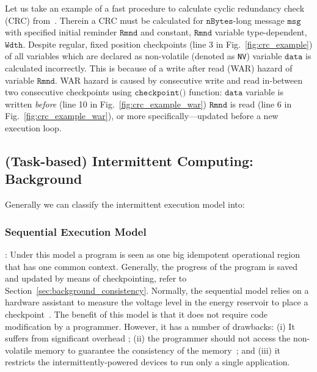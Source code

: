 Let us take an example of a fast procedure to calculate cyclic redundancy check (CRC) from~\cite{hicks_mibench2_2016}. Therein a CRC must be calculated for $\texttt{nBytes}$-long message $\texttt{msg}$ with specified initial reminder $\texttt{Rmnd}$ and constant, $\texttt{Rmnd}$ variable type-dependent, $\texttt{Wdth}$. Despite regular, fixed position checkpoints (line 3 in Fig.~\ref{fig:crc_example}) of all variables which are declared as non-volatile (denoted as \texttt{NV}) variable $\texttt{data}$ is calculated incorrectly. This is because of a write after read (WAR) hazard of variable $\texttt{Rmnd}$. WAR hazard is caused by consecutive write and read in-between two consecutive checkpoints using $\texttt{checkpoint()}$ function: $\texttt{data}$ variable is written \emph{before} (line 10 in Fig.~\ref{fig:crc_example_war}) $\texttt{Rmnd}$ is read (line 6 in Fig.~\ref{fig:crc_example_war}), or more specifically---updated before a new execution loop. 

\subsection{(Task-based) Intermittent Computing: Background}

Generally we can classify the intermittent execution model into:

\subsubsection{Sequential Execution Model}: Under this model a program is seen as one big idempotent operational region that has one common context. Generally, the progress of the program is saved and updated by means of checkpointing, refer to Section~\ref{sec:background_consistency}. Normally, the sequential model relies on a hardware assistant to measure the voltage level in the energy reservoir to place a checkpoint~\cite{mementos,mottola2017harvos,hibernus}. The benefit of this model is that it does not require code modification by a programmer. However, it has a number of drawbacks: (i) It suffers from significant overhead \cite{chain}; (ii) the programmer should not access the non-volatile memory to guarantee the consistency of the memory~\cite{}; and (iii) it restricts the intermittently-powered devices to run only a single application.

